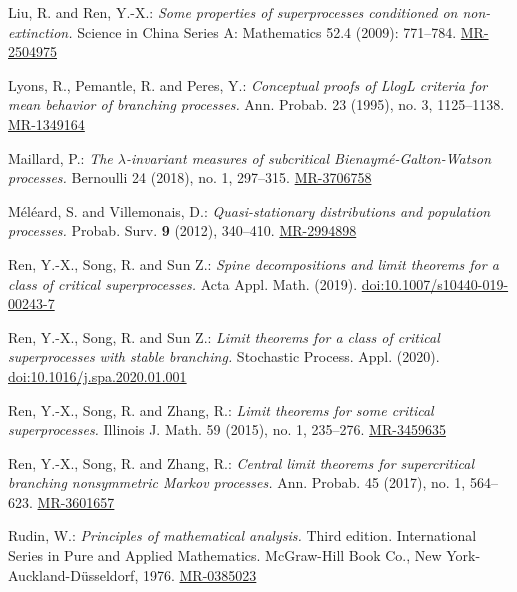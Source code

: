\documentclass[12pt,a4paper]{amsart}
\numberwithin{equation}{section}
\theoremstyle{plain}
\theoremstyle{definition}
\theoremstyle{remark}
\def\MR#1{\href{http://www.ams.org/mathscinet-getitem?mr=#1}{MR-#1}}
\def\DOI#1{\href{https://doi.org/#1}{doi:#1}}
\begin{document}
\begin{thebibliography}{99}
	Liu, R. and Ren, Y.-X.:
	\emph{Some properties of superprocesses conditioned on non-extinction.}
	Science in China Series A: Mathematics 52.4 (2009): 771--784.
	\MR{2504975}
	
	Lyons, R., Pemantle, R. and Peres, Y.:
	\emph{Conceptual proofs of LlogL criteria for mean behavior of branching processes.}
	Ann. Probab. 23 (1995), no. 3, 1125--1138.
	\MR{1349164}
	
	Maillard, P.:
	\emph{The $\lambda$-invariant measures of subcritical Bienaym\'e-Galton-Watson processes.}
	Bernoulli 24 (2018), no. 1, 297--315.
	\MR{3706758}

	M\'el\'eard, S. and Villemonais, D.:
	\emph{Quasi-stationary distributions and population processes.}
	Probab. Surv. \textbf{9} (2012),
	340--410.
	\MR{2994898}
	
	Ren, Y.-X., Song, R. and Sun Z.:
	\emph{Spine decompositions and limit theorems for a class of critical superprocesses.}
	Acta Appl. Math. (2019).
	\DOI{10.1007/s10440-019-00243-7}
	
	Ren, Y.-X., Song, R. and Sun Z.:
	\emph{Limit theorems for a class of critical superprocesses with stable branching.}
	Stochastic Process. Appl. (2020).
	\DOI{10.1016/j.spa.2020.01.001}

	Ren, Y.-X., Song, R. and Zhang, R.:
	\emph{Limit theorems for some critical superprocesses.}
	Illinois J. Math. 59 (2015), no. 1, 235--276.
	\MR{3459635}

	Ren, Y.-X., Song, R. and Zhang, R.:
	\emph{Central limit theorems for supercritical branching nonsymmetric Markov processes.}
	Ann. Probab. 45 (2017), no. 1, 564--623.
	\MR{3601657}
	
	Rudin, W.:
	\emph{Principles of mathematical analysis.}
	Third edition. International Series in Pure and Applied Mathematics. McGraw-Hill Book Co., New York-Auckland-D\"usseldorf, 1976.
	\MR{0385023}


\end{thebibliography}
\end{document}
